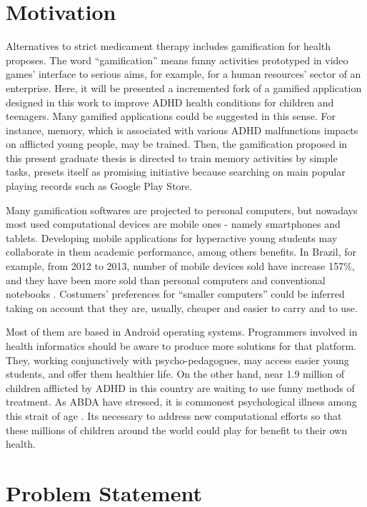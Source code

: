   
\section{Motivation}
\label{sc:motivation}

Alternatives to strict medicament therapy includes gamification for health proposes. The word ``gamification'' means funny activities prototyped in video games' interface to serious aims, for example, for a human resources' sector of an enterprise. Here, it will be presented a incremented fork of a gamified application designed in this work to improve ADHD health conditions for children and teenagers. Many gamified applications could be suggested in this sense. For instance, memory, which is associated with various ADHD malfunctions impacts on afflicted young people, may be trained. Then, the gamification proposed in this present graduate thesis is directed to train memory activities by simple tasks, presets itself as promising initiative because searching on main popular playing records such as Google Play Store.

Many gamification softwares are projected to personal computers, but nowadays most used computational devices are mobile ones - namely smartphones and tablets. Developing mobile applications for hyperactive young students may collaborate in them academic performance, among others benefits. In Brazil, for example, from 2012 to 2013, number of mobile devices sold have increase 157\%, and they have been more sold than personal computers and conventional notebooks \citep{Villa}. Costumers' preferences for ``smaller computers'' could be inferred taking on account that they are, usually, cheaper and easier to carry and to use.  

Most of them are based in Android operating systems. Programmers involved in health informatics should be aware to produce more solutions for that platform. They, working conjunctively with psycho-pedagogues, may access easier young students, and offer them healthier life. On the other hand, near 1.9 million of children afflicted by ADHD in this country are waiting to use funny methods of treatment. As ABDA have stressed, it is commonest psychological illness among this strait of age  \citep{Villa}. Its necessary to address new computational efforts so that these millions of children around the world could play for benefit to their own health.


\section{Problem Statement}
\label{sc:problem} 

